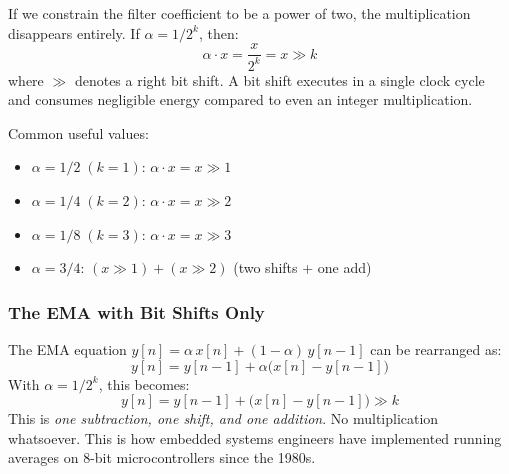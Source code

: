 If we constrain the filter coefficient to be a power of two, the
multiplication disappears entirely. If $\alpha = 1/2^k$, then:
%
\begin{equation}
  \alpha \cdot x = \frac{x}{2^k} = x \gg k
  \label{eq:shift-multiply}
\end{equation}
%
where $\gg$ denotes a right bit shift. A bit shift executes in a
single clock cycle and consumes negligible energy compared to even
an integer multiplication.

Common useful values:
\begin{itemize}[leftmargin=2em]
  \item $\alpha = 1/2 \;(k=1)$: $\alpha \cdot x = x \gg 1$
  \item $\alpha = 1/4 \;(k=2)$: $\alpha \cdot x = x \gg 2$
  \item $\alpha = 1/8 \;(k=3)$: $\alpha \cdot x = x \gg 3$
  \item $\alpha = 3/4$: $(x \gg 1) + (x \gg 2)$ (two shifts + one add)
\end{itemize}

\subsubsection{The EMA with Bit Shifts Only}

The EMA equation $y[n] = \alpha \, x[n] + (1-\alpha) \, y[n-1]$
can be rearranged as:
%
\begin{equation}
  y[n] = y[n-1] + \alpha \bigl(x[n] - y[n-1]\bigr)
  \label{eq:ema-rearranged}
\end{equation}
%
With $\alpha = 1/2^k$, this becomes:
%
\begin{equation}
  y[n] = y[n{-}1] + \bigl(x[n] - y[n{-}1]\bigr) \gg k
  \label{eq:ema-bitshift}
\end{equation}
%
This is \emph{one subtraction, one shift, and one addition}. No
multiplication whatsoever. This is how embedded systems engineers
have implemented running averages on 8-bit microcontrollers since
the 1980s.

